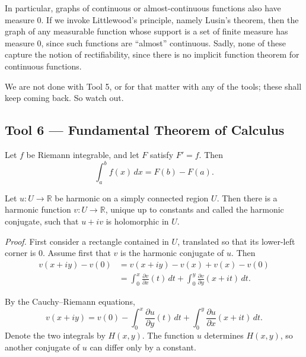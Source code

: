 \documentclass[11pt,a4paper]{article}
\begin{document}
In particular, graphs of continuous or almost-continuous functions also have measure $0$. If we invoke Littlewood's principle, namely Lusin's theorem, then the graph of any measurable function whose support is a set of finite measure has measure $0$, since such functions are ``almost'' continuous. Sadly, none of these capture the notion of rectifiability, since there is no implicit function theorem for continuous functions.

We are not done with Tool 5, or for that matter with any of the tools; these shall keep coming back. So watch out.


\subsection*{Tool 6 — Fundamental Theorem of Calculus}
Let $f$ be Riemann integrable, and let $F$ satisfy $F'=f$. Then
\[
\int_a^b f(x)\,dx=F(b)-F(a).
\]


Let $u\colon U\to\mathbb R$ be harmonic on a simply connected region $U$. Then there is a harmonic function $v\colon U\to\mathbb R$, unique up to constants and called the harmonic conjugate, such that $u+iv$ is holomorphic in $U$.

\textit{Proof.}
First consider a rectangle contained in $U$, translated so that its lower-left corner is $0$.
Assume first that $v$ is the harmonic conjugate of $u$. Then
\begin{align*}
v(x+iy)-v(0)
&=v(x+iy)-v(x)+v(x)-v(0)\\
&=\int_0^x\frac{\partial v}{\partial x}(t)\,dt
+\int_0^y\frac{\partial v}{\partial y}(x+it)\,dt.
\end{align*}


By the Cauchy--Riemann equations,
\[
v(x+iy)=v(0)
-\int_0^x\frac{\partial u}{\partial y}(t)\,dt
+\int_0^y\frac{\partial u}{\partial x}(x+it)\,dt.
\]
Denote the two integrals by $H(x,y)$. The function $u$ determines $H(x,y)$, so another conjugate of $u$ can differ only by a constant.
\end{document}
